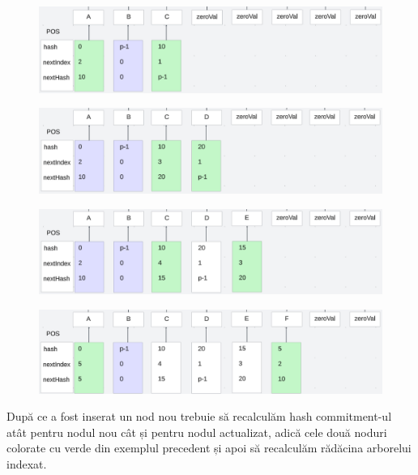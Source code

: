 \documentclass[12pt, letterpaper]{article}
\begin{document}
\begin{figure}[ht]
    \includegraphics[width=1\textwidth]{images/nullTreeInsert/nullTreeInsert10.png}
    \label{fig:nullTreeInsert10}
\end{figure}

\begin{figure}[ht]
    \includegraphics[width=1\textwidth]{images/nullTreeInsert/nullTreeInsert20.png}
    \label{fig:nullTreeInsert20}
\end{figure}

\begin{figure}[ht]
    \includegraphics[width=1\textwidth]{images/nullTreeInsert/nullTreeInsert15.png}
    \label{fig:nullTreeInsert15}
\end{figure}

\begin{figure}[ht]
    \includegraphics[width=1\textwidth]{images/nullTreeInsert/nullTreeInsert5.png}
    \label{fig:nullTreeInsert5}
\end{figure}

\newpage

După ce a fost inserat un nod nou trebuie să recalculăm hash commitment-ul atât pentru nodul nou cât și pentru nodul actualizat, adică cele două noduri colorate cu verde din exemplul precedent și apoi să recalculăm rădăcina arborelui indexat.
\end{document}
